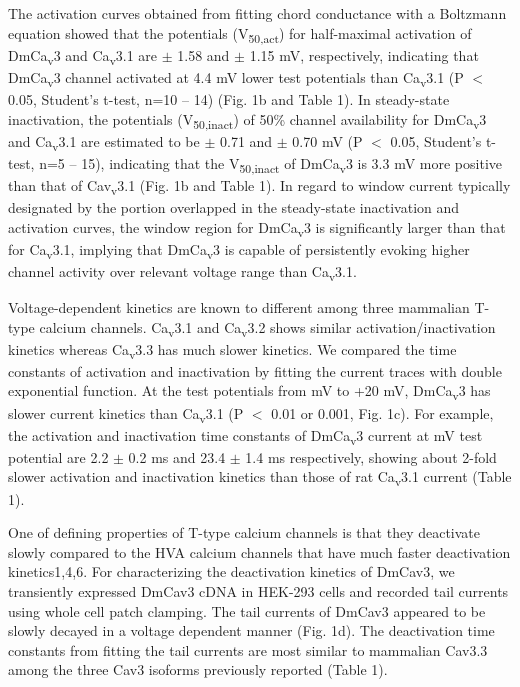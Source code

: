 The activation curves obtained from fitting chord conductance with a Boltzmann equation showed that the potentials (V\textsubscript{50,act}) for half-maximal activation of DmCa\textsubscript{v}3 and Ca\textsubscript{v}3.1 are  $\pm$ 1.58 and  $\pm$ 1.15 mV, respectively, indicating that DmCa\textsubscript{v}3 channel activated at 4.4 mV lower test potentials than Ca\textsubscript{v}3.1 (P $<$ 0.05, Student's t-test, n=10 -- 14) (Fig. 1b and Table 1).
In steady-state inactivation, the potentials (V\textsubscript{50,inact}) of 50\% channel availability for DmCa\textsubscript{v}3 and Ca\textsubscript{v}3.1 are estimated to be  $\pm$ 0.71 and  $\pm$ 0.70 mV (P $<$ 0.05, Student's t-test, n=5 -- 15), indicating that the V\textsubscript{50,inact} of DmCa\textsubscript{v}3 is 3.3 mV more positive than that of Cav\textsubscript{v}3.1 (Fig. 1b and Table 1).
In regard to window current typically designated by the portion overlapped in the steady-state inactivation and activation curves, the window region for DmCa\textsubscript{v}3 is significantly larger than that for Ca\textsubscript{v}3.1, implying that DmCa\textsubscript{v}3 is capable of persistently evoking higher channel activity over relevant voltage range than Ca\textsubscript{v}3.1.

Voltage-dependent kinetics are known to different among three mammalian T-type calcium channels\cite{10594642}.
Ca\textsubscript{v}3.1 and Ca\textsubscript{v}3.2 shows similar activation/inactivation kinetics whereas Ca\textsubscript{v}3.3 has much slower kinetics.
We compared the time constants of activation and inactivation by fitting the current traces with double exponential function.
At the test potentials from  mV to +20 mV,  DmCa\textsubscript{v}3 has slower current kinetics than Ca\textsubscript{v}3.1 (P $<$ 0.01 or 0.001, Fig. 1c).
For example, the activation and inactivation time constants of DmCa\textsubscript{v}3 current at  mV test potential are 2.2 $\pm$ 0.2 ms and 23.4 $\pm$ 1.4 ms respectively, showing about 2-fold slower activation and inactivation kinetics than those of rat Ca\textsubscript{v}3.1 current (Table 1).

One of defining properties of T-type calcium channels is that they deactivate slowly compared to the HVA calcium channels that have much faster deactivation kinetics1,4,6. For characterizing the deactivation kinetics of DmCav3, we transiently expressed DmCav3 cDNA in HEK-293 cells and recorded tail currents using whole cell patch clamping. The tail currents of DmCav3 appeared to be slowly decayed in a voltage dependent manner (Fig. 1d). The deactivation time constants from fitting the tail currents are most similar to mammalian Cav3.3 among the three Cav3 isoforms previously reported (Table 1). 

